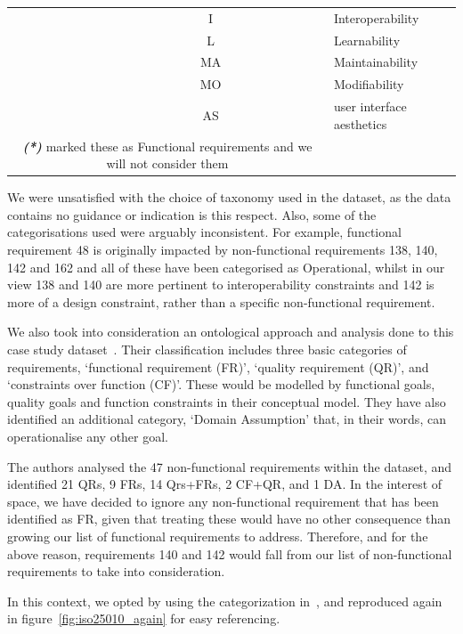 \documentclass[dissertation,final]{softeng}
\newcommand{\nfrs}{non-functional requirements\xspace}
\begin{document}
{\begin{table}[h!]
{{\begin{tabular}{c c l}
                & I	 & Interoperability \\
                & L	 & Learnability \\
                & MA & Maintainability \\
                & MO & Modifiability \\
                & AS & user interface aesthetics \\
                \multicolumn{2}{c}{\multirow{3}[1]{*}{\emph{\bfseries{(*)}} \citet{MylopoulosOnt2014} marked these as Functional requirements and we will not consider them}} 
            \end{tabular}
        }
  }
\end{table}
}

We were unsatisfied with the choice of taxonomy used in the dataset, as the data contains no guidance or indication is this respect. Also, some of the categorisations used were arguably inconsistent. For example, functional requirement 48 is originally impacted by non-functional requirements 138, 140, 142 and 162 and all of these have been categorised as Operational, whilst in our view 138 and 140 are more pertinent to interoperability constraints and 142 is more of a design constraint, rather than a specific non-functional requirement.

We also took into consideration an ontological approach and analysis done to this case study dataset~\citep{MylopoulosOnt2014}. Their classification includes three basic categories of requirements, `functional requirement (FR)', `quality requirement (QR)', and `constraints over function (CF)'. These would be modelled by functional goals, quality goals and function constraints in their conceptual model. They have also identified an additional category, `Domain Assumption' that, in their words, can operationalise any other goal.

The authors analysed the 47 \nfrs within the dataset, and identified 21 QRs, 9 FRs, 14 Qrs+FRs, 2 CF+QR, and 1 DA. In the interest of space, we have decided to ignore any non-functional requirement that has been identified as FR, given that treating these would have no other consequence than growing our list of functional requirements to address. Therefore, and for the above reason, requirements 140 and 142 would fall from our list of \nfrs to take into consideration.

In this context, we opted by using the categorization in~, and reproduced again in figure~\ref{fig:iso25010_again} for easy referencing.
\end{document}
